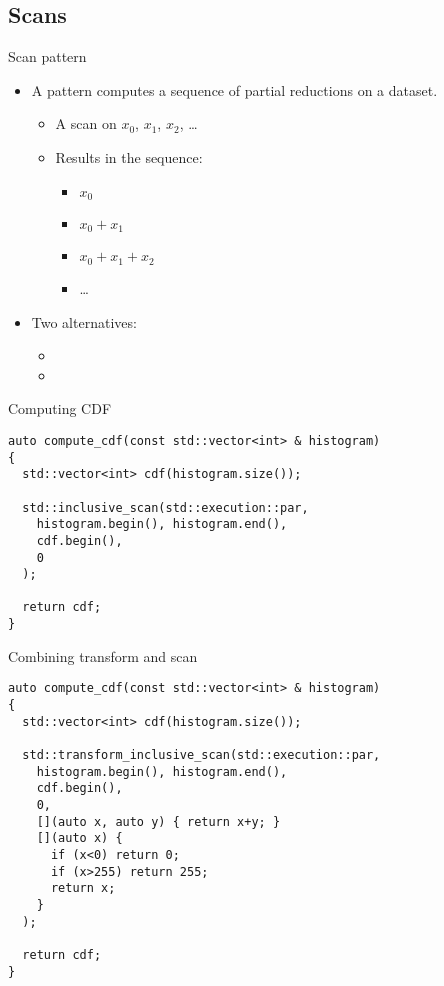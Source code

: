 \subsection{Scans}

\begin{frame}[t]{Scan pattern}
\begin{itemize}
  \item A  pattern computes a sequence of
        partial reductions on a dataset.
    \begin{itemize}
      \item A scan on $x_0$, $x_1$, $x_2$, \ldots 
      \item Results in the sequence:
        \begin{itemize}
          \item $x_0$
          \item $x_0 + x_1$
          \item $x_0 + x_1 + x_2$
          \item \ldots
        \end{itemize}
    \end{itemize}
    \vfill
    \item Two alternatives:
      \begin{itemize}
        \item {}
        \item {}
      \end{itemize}
\end{itemize}
\end{frame}

\begin{frame}[t,fragile]{Computing CDF}
\begin{lstlisting}
auto compute_cdf(const std::vector<int> & histogram)
{
  std::vector<int> cdf(histogram.size());

  std::inclusive_scan(std::execution::par,
    histogram.begin(), histogram.end(),
    cdf.begin(),
    0
  );

  return cdf;
}
\end{lstlisting}
\end{frame}

\begin{frame}[t,fragile]{Combining transform and scan}
\begin{lstlisting}
auto compute_cdf(const std::vector<int> & histogram)
{
  std::vector<int> cdf(histogram.size());

  std::transform_inclusive_scan(std::execution::par,
    histogram.begin(), histogram.end(),
    cdf.begin(),
    0,
    [](auto x, auto y) { return x+y; }
    [](auto x) {
      if (x<0) return 0;
      if (x>255) return 255;
      return x;
    }
  );

  return cdf;
}
\end{lstlisting}
\end{frame}
